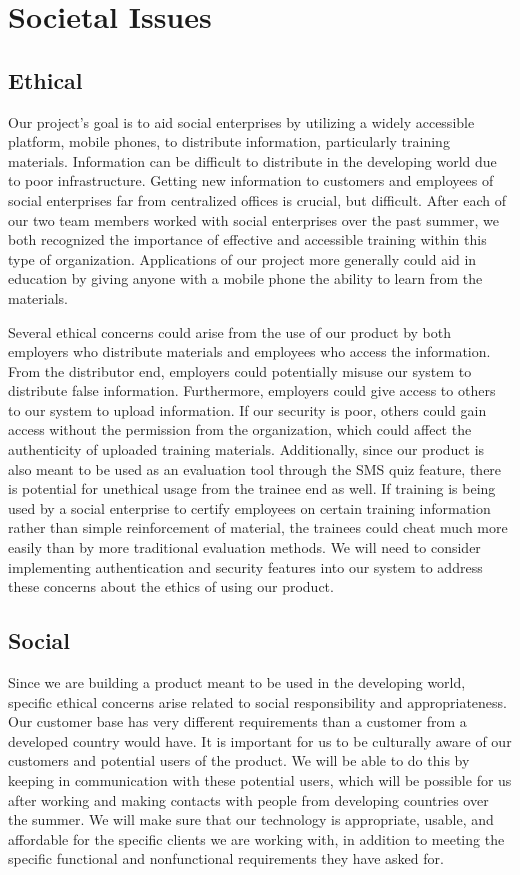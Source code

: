 \chapter{Societal Issues}

\section*{Ethical}
Our project's goal is to aid social enterprises by utilizing a widely accessible platform, mobile phones, to distribute information, particularly training materials. Information can be difficult to distribute in the developing world due to poor infrastructure. Getting new information to customers and employees of social enterprises far from centralized offices is crucial, but difficult. After each of our two team members worked with social enterprises over the past summer, we both recognized the importance of effective and accessible training within this type of organization. Applications of our project more generally could aid in education by giving anyone with a mobile phone the ability to learn from the materials.

Several ethical concerns could arise from the use of our product by both employers who distribute materials and employees who access the information. From the distributor end, employers could potentially misuse our system to distribute false information. Furthermore, employers could give access to others to our system to upload information. If our security is poor, others could gain access without the permission from the organization, which could affect the authenticity of uploaded training materials. Additionally, since our product is also meant to be used as an evaluation tool through the SMS quiz feature, there is potential for unethical usage from the trainee end as well. If training is being used by a social enterprise to certify employees on certain training information rather than simple reinforcement of material, the trainees could cheat much more easily than by more traditional evaluation methods. We will need to consider implementing authentication and security features into our system to address these concerns about the ethics of using our product.

\section*{Social}
Since we are building a product meant to be used in the developing world, specific ethical concerns arise related to social responsibility and appropriateness. Our customer base has very different requirements than a customer from a developed country would have. It is important for us to be culturally aware of our customers and potential users of the product. We will be able to do this by keeping in communication with these potential users, which will be possible for us after working and making contacts with people from developing countries over the summer. We will make sure that our technology is appropriate, usable, and affordable for the specific clients we are working with, in addition to meeting the specific functional and nonfunctional requirements they have asked for.


